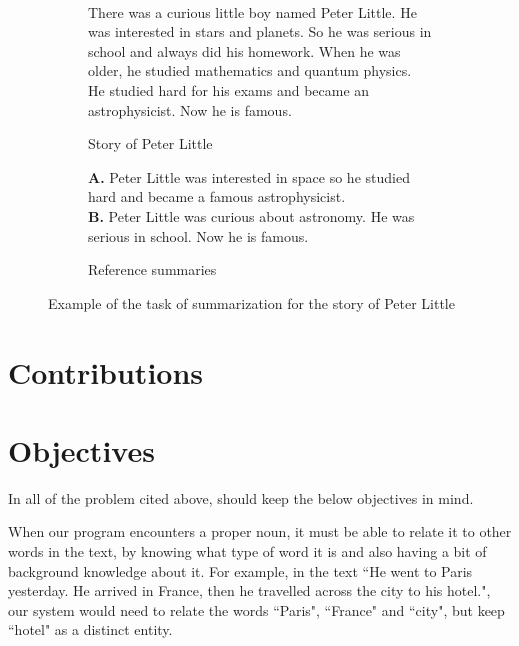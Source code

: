 \begin{figure}[H]\
\begin{subfigure}{\textwidth}
\begin{displayquote}
There was a curious little boy named Peter Little. He was interested in stars and planets. So he was serious in school and always did his homework. When he was older, he studied mathematics and quantum physics. He studied hard for his exams and became an astrophysicist. Now he is famous.
\end{displayquote}
\caption{Story of Peter Little}
\vspace{\baselineskip}
\end{subfigure}
\begin{subfigure}{\textwidth}
\begin{displayquote}
\textbf{A.} Peter Little was interested in space so he studied hard and became a famous astrophysicist.\\
\textbf{B.} Peter Little was curious about astronomy. He was serious in school. Now he is famous.\\
\caption{Reference summaries}
\end{displayquote}
\end{subfigure}
\caption{Example of the task of summarization for the story of Peter Little}
\label{fig:peter_little}
\end{figure}

\section{Contributions}

\newpage

\section{Objectives}

In all of the problem cited above, should keep the below objectives in mind.

\begin{objective}
When our program encounters a proper noun, it must be able to relate it to other words in the text, by knowing what type of word it is and also having a bit of background knowledge about it. For example, in the text ``He went to Paris yesterday. He arrived in France, then he travelled across the city to his hotel.", our system would need to relate the words ``Paris", ``France" and ``city", but keep ``hotel" as a distinct entity.
\end{objective}

